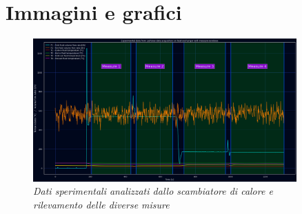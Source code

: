 \documentclass[a4paper,10pt]{article}                                                                                       %
\begin{document}
\section{Immagini e grafici}                                                                                                %
\label{sec:imgs_graphs}                                                                                                     %
\begin{figure}[H]                                                                                                           %
  \centering                                                                                                                %
  \includegraphics[width=0.9\textwidth]{../final_doc/code_exports/imgs/measures.png}                                        %
  \caption{\textit{Dati sperimentali analizzati dallo scambiatore di calore e rilevamento delle diverse misure}}            %
  \label{fig:measures}                                                                                                      %
\end{figure}                                                                                                                %
\end{document}
